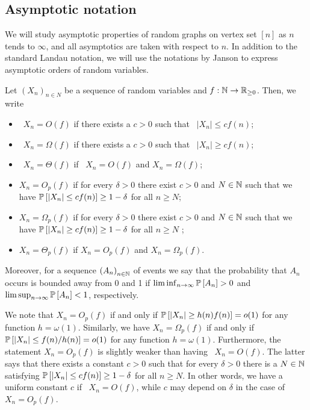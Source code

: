 \subsection{Asymptotic notation}\label{CBsub:asymptotic_notation}
We will study asymptotic properties of random graphs on vertex set $[n]$ as $n$ tends to $\infty$, and all asymptotics are taken with respect to $n$.
In addition to the standard Landau notation, we will use the notations by Janson \cite{Janson2011} to express asymptotic orders of random variables.

\begin{definition}\label{CBdef:asy}
	Let $\left(X_n\right)_{n \in N}$ be a sequence of random variables and $f: \mathbb{N} \to \mathbb{R}_{\geq 0}$.
	Then, we write
	\begin{itemize}
		\item
		\whp\ $X_n=O\left(f\right)$ if there exists a $c>0$ such that \whp\ $|X_n|\leq c f(n)$;
		\item
		\whp\ $X_n=\Omega\left(f\right)$ if there exists a $c>0$ such that \whp\ $|X_n|\geq c f(n)$;
		\item
		\whp\ $X_n=\Theta\left(f\right)$ if \whp\ $X_n=O\left(f\right)$ and $X_n=\Omega\left(f\right)$;
		\item 
		$X_n=O_p\left(f\right)$ if for every $\delta>0$ there exist $c>0$ and $N \in \mathbb{N}$ such that we have $\mathbb{P}\left[|X_n|\leq c f(n)\right]\geq 1-\delta$ for all $n\geq N$;
		\item 
		$X_n=\Omega_p\left(f\right)$ if for every $\delta>0$ there exist $c>0$ and $N \in \mathbb{N}$ such that we have $\mathbb{P}\left[|X_n|\geq c f(n)\right]\geq 1-\delta$ for all $n\geq N$ ;
		\item 
		$X_n=\Theta_p\left(f\right)$ if $X_n=O_p\left(f\right)$ and $X_n=\Omega_p\left(f\right)$.
	\end{itemize}
Moreover, for a sequence $\left(A_n\right)_{n\in\mathbb{N}}$ of events we say that the probability that $A_n$ occurs is bounded away from 0 and 1 if $\liminf_{n \to \infty}\mathbb{P}\left[A_n\right]>0$ and $\limsup_{n \to \infty}\mathbb{P}\left[A_n\right]<1$, respectively. 
\end{definition} 

We note that $X_n=O_p\left(f\right)$ if and only if $\mathbb{P}\left[\left|X_n\right|\geq h(n)f(n)\right]=o(1)$ for any function $h=\omega(1)$. Similarly, we have $X_n=\Omega_p\left(f\right)$ if and only if $\mathbb{P}\left[\left|X_n\right|\leq f(n)/h(n)\right]=o(1)$ for any function $h=\omega(1)$. Furthermore, the statement $X_n=O_p\left(f\right)$ is slightly weaker than having \whp\ $X_n=O\left(f\right)$. The latter says that there exists a constant $c>0$ such that for every $\delta>0$ there is a $N\in \mathbb{N}$ satisfying $\mathbb{P}\left[|X_n|\leq c f(n)\right]\geq 1-\delta$ for all $n\geq N$. In other words, we have a uniform constant $c$ if \whp\ $X_n=O\left(f\right)$, while $c$ may depend on $\delta$ in the case of $X_n=O_p\left(f\right)$.


